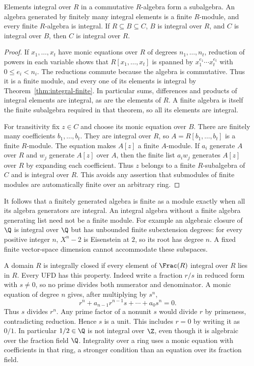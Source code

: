 \begin{theorem}\label{thm:integrality-transitive}
Elements integral over $R$ in a commutative $R$-algebra form a subalgebra.
An algebra generated by finitely many integral elements is a finite
$R$-module, and every finite $R$-algebra is integral.
If $R\subseteq B\subseteq C$, $B$ is integral over $R$, and $C$ is
integral over $B$, then $C$ is integral over $R$.
\end{theorem}
\begin{proof}
If $x_1,\ldots,x_t$ have monic equations over $R$ of degrees
$n_1,\ldots,n_t$, reduction of powers in each variable shows that
$R[x_1,\ldots,x_t]$ is spanned by
$x_1^{e_1}\cdots x_t^{e_t}$ with $0\le e_i<n_i$.
The reductions commute because the algebra is commutative.
Thus it is a finite module, and every one of its elements is integral
by Theorem~\ref{thm:integral-finite}. In particular sums, differences
and products of integral elements are integral, as are the elements
of $R$. A finite algebra is itself the finite subalgebra required
in that theorem, so all its elements are integral.

For transitivity fix $z\in C$ and choose its monic equation over $B$.
There are finitely many coefficients $b_1,\ldots,b_t$.
They are integral over $R$, so $A=R[b_1,\ldots,b_t]$ is a finite
$R$-module. The equation makes $A[z]$ a finite $A$-module.
If $a_i$ generate $A$ over $R$ and $w_j$ generate $A[z]$ over $A$,
then the finite list $a_iw_j$ generates $A[z]$ over $R$ by expanding
each coefficient. Thus $z$ belongs to a finite $R$-subalgebra of $C$
and is integral over $R$. This avoids any assertion that submodules
of finite modules are automatically finite over an arbitrary ring.
\end{proof}
It follows that a finitely generated algebra is finite as a module
exactly when all its algebra generators are integral.
An integral algebra without a finite algebra generating list need
not be a finite module. For example an algebraic closure of $\Q$
is integral over $\Q$ but has unbounded finite subextension degrees:
for every positive integer $n$, $X^n-2$ is Eisenstein at $2$, so its root has
degree $n$. A fixed finite vector-space dimension cannot accommodate
these subspaces.

A domain $R$ is integrally closed if every element of $\Frac(R)$
integral over $R$ lies in $R$. Every UFD has this property.
Indeed write a fraction $r/s$ in reduced form with $s\ne0$, so no prime
divides both numerator and denominator. A monic equation of degree
$n$ gives, after multiplying by $s^n$,
\[
 r^n+a_{n-1}r^{n-1}s+\cdots+a_0s^n=0.
\]
Thus $s$ divides $r^n$. Any prime factor of a nonunit $s$ would divide
$r$ by primeness, contradicting reduction. Hence $s$ is a unit.
This includes $r=0$ by writing it as $0/1$.
In particular $1/2\in\Q$ is not integral over $\Z$, even though it is
algebraic over the fraction field $\Q$. Integrality over a ring uses a
monic equation with coefficients in that ring, a stronger condition
than an equation over its fraction field.

